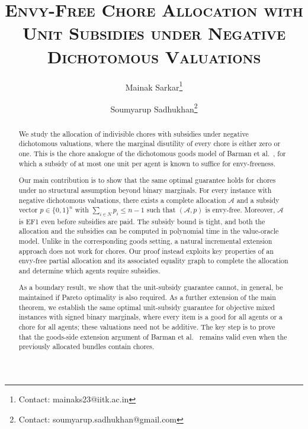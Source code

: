\documentclass[11pt]{article}
\theoremstyle{plain}
\theoremstyle{plain}
\begin{document}
\makeatletter
\renewcommand\@makefnmark{\hbox{\@textsuperscript{\normalfont\@thefnmark}}}
\makeatother
\renewcommand{\thefootnote}{\fnsymbol{footnote}}



\title{\textsc{Envy-Free Chore Allocation with Unit Subsidies under Negative Dichotomous Valuations
}}

\author[1]{Mainak Sarkar\footnote{Contact: mainaks23@iitk.ac.in}}
\author[1]{Soumyarup Sadhukhan\footnote{Contact: soumyarup.sadhukhan@gmail.com}}

\date{}


\maketitle
\renewcommand{\thefootnote}{\arabic{footnote}}
\setcounter{footnote}{0}

\begin{abstract}
We study the allocation of indivisible chores with subsidies under negative dichotomous valuations, where the marginal disutility of every chore is either zero or one. This is the chore analogue of the dichotomous goods model of Barman et al.~\cite{BKNS22}, for which a subsidy of at most one unit per agent is known to suffice for envy-freeness.

Our main contribution is to show that the same optimal guarantee holds for chores under no structural assumption beyond binary marginals. For every instance with negative dichotomous valuations, there exists a complete allocation $\mathcal{A}$ and a subsidy vector $p\in\{0,1\}^n$ with $\sum_{i\in N} p_i\le n-1$ such that $(\mathcal{A},p)$ is envy-free. Moreover, $\mathcal{A}$ is EF1 even before subsidies are paid. The subsidy bound is tight, and both the allocation and the subsidies can be computed in polynomial time in the value-oracle model. Unlike in the corresponding goods setting, a natural incremental extension approach does not work for chores. Our proof instead exploits key properties of an envy-free partial allocation and its associated equality graph to complete the allocation and determine which agents require subsidies.

As a boundary result, we show that the unit-subsidy guarantee cannot, in general, be maintained if Pareto optimality is also required. As a further extension of the main theorem, we establish the same optimal unit-subsidy guarantee for objective mixed instances with signed binary marginals, where every item is a good for all agents or a chore for all agents; these valuations need not be additive. The key step is to prove that the goods-side extension argument of Barman et al.~\cite{BKNS22} remains valid even when the previously allocated bundles contain chores.
\end{abstract}
\end{document}
